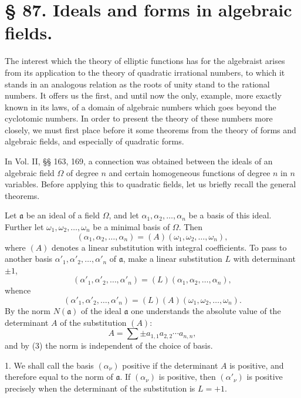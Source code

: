 \documentclass[11pt]{article}
\begin{document}
\section*{§ 87. Ideals and forms in algebraic fields.}

The interest which the theory of elliptic functions has for the algebraist arises from its application to the theory of quadratic irrational numbers, to which it stands in an analogous relation as the roots of unity stand to the rational numbers. It offers us the first, and until now the only, example, more exactly known in its laws, of a domain of algebraic numbers which goes beyond the cyclotomic numbers. In order to present the theory of these numbers more closely, we must first place before it some theorems from the theory of forms and algebraic fields, and especially of quadratic forms.

In Vol. II, §§ 163, 169, a connection was obtained between the ideals of an algebraic field $\Omega$ of degree $n$ and certain homogeneous functions of degree $n$ in $n$ variables. Before applying this to quadratic fields, let us briefly recall the general theorems.

Let $\mathfrak a$ be an ideal of a field $\Omega$, and let $\alpha_1,\alpha_2,
\ldots,\alpha_n$ be a basis of this ideal. Further let $\omega_1,\omega_2,
\ldots,\omega_n$ be a minimal basis of $\Omega$. Then
\begin{equation}
 (\alpha_1,\alpha_2,\ldots,\alpha_n)=(A)(\omega_1,\omega_2,
\ldots,\omega_n),\tag{1}
\end{equation}
where $(A)$ denotes a linear substitution with integral coefficients. To pass to another basis $\alpha'_1,\alpha'_2,
\ldots,\alpha'_n$ of $\mathfrak a$, make a linear substitution $L$ with determinant $\pm1$,
\begin{equation}
 (\alpha'_1,\alpha'_2,
\ldots,\alpha'_n)=(L)(\alpha_1,\alpha_2,
\ldots,\alpha_n),\tag{2}
\end{equation}
whence
\begin{equation}
 (\alpha'_1,\alpha'_2,
\ldots,\alpha'_n)=(L)(A)(\omega_1,\omega_2,
\ldots,\omega_n).\tag{3}
\end{equation}
By the norm $N(\mathfrak a)$ of the ideal $\mathfrak a$ one understands the absolute value of the determinant $A$ of the substitution $(A)$:
\[
 A=\sum\pm a_{1,1}a_{2,2}\cdots a_{n,n},
\]
and by (3) the norm is independent of the choice of basis.

1. We shall call the basis $(\alpha_\nu)$ positive if the determinant $A$ is positive, and therefore equal to the norm of $\mathfrak a$. If $(\alpha_\nu)$ is positive, then $(\alpha'_\nu)$ is positive precisely when the determinant of the substitution is $L=+1$.
\end{document}
